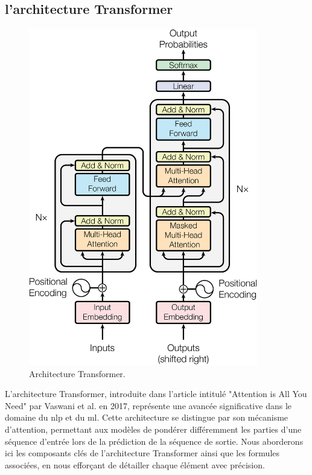 \newpage
\subsection{l'architecture Transformer \cite{Caelen_Blete_2023, vaswani2023attention}}
\label{ch:1:section:transformer}

\begin{figure}[H]
    \centering
    \includegraphics[width=10cm]{gfx/ModalNet-21.png}
    \caption{Architecture Transformer. \cite{vaswani2023attention}}
    \label{fig:transformer-architecture}
\end{figure}

L'architecture Transformer, introduite dans l'article intitulé "Attention is All You Need" par Vaswani et al. en 2017, représente une avancée significative dans le domaine du \ac{nlp} et du \ac{ml}. Cette architecture se distingue par son mécanisme d'attention, permettant aux modèles de pondérer différemment les parties d'une séquence d'entrée lors de la prédiction de la séquence de sortie. Nous aborderons ici les composants clés de l'architecture Transformer ainsi que les formules associées, en nous efforçant de détailler chaque élément avec précision.

